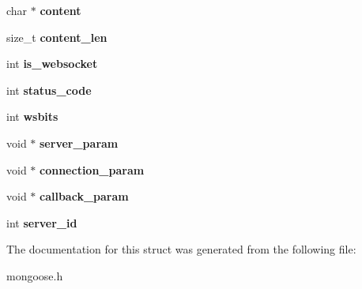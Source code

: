 \begin{DoxyCompactItemize}
\item 
\hypertarget{structmg__connection_a817740e63b59b7c45685f1cdb987f98c}{char $\ast$ {\bfseries content}}\label{structmg__connection_a817740e63b59b7c45685f1cdb987f98c}

\item 
\hypertarget{structmg__connection_a6e7a6042a40453587cfca0d325a30601}{size\-\_\-t {\bfseries content\-\_\-len}}\label{structmg__connection_a6e7a6042a40453587cfca0d325a30601}

\item 
\hypertarget{structmg__connection_ad1642e1e64e670e8af715a5aad9e06b0}{int {\bfseries is\-\_\-websocket}}\label{structmg__connection_ad1642e1e64e670e8af715a5aad9e06b0}

\item 
\hypertarget{structmg__connection_ae0163f2496aed16dc972e2139b66bb93}{int {\bfseries status\-\_\-code}}\label{structmg__connection_ae0163f2496aed16dc972e2139b66bb93}

\item 
\hypertarget{structmg__connection_a022231787b07741122d408e9a42a2452}{int {\bfseries wsbits}}\label{structmg__connection_a022231787b07741122d408e9a42a2452}

\item 
\hypertarget{structmg__connection_a1d8ed96e79904e61cbcaa85812c040a8}{void $\ast$ {\bfseries server\-\_\-param}}\label{structmg__connection_a1d8ed96e79904e61cbcaa85812c040a8}

\item 
\hypertarget{structmg__connection_abd930cc6bad9df41986f7c63bddd1d47}{void $\ast$ {\bfseries connection\-\_\-param}}\label{structmg__connection_abd930cc6bad9df41986f7c63bddd1d47}

\item 
\hypertarget{structmg__connection_a767bf7e481bd80da1beabec5e3880c90}{void $\ast$ {\bfseries callback\-\_\-param}}\label{structmg__connection_a767bf7e481bd80da1beabec5e3880c90}

\item 
\hypertarget{structmg__connection_a4bde8827f293f536b64c298b3e00cf1b}{int {\bfseries server\-\_\-id}}\label{structmg__connection_a4bde8827f293f536b64c298b3e00cf1b}

\end{DoxyCompactItemize}


The documentation for this struct was generated from the following file\-:\begin{DoxyCompactItemize}
\item 
mongoose.\-h\end{DoxyCompactItemize}
